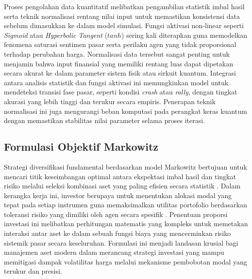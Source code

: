 Proses pengolahan data kuantitatif melibatkan pengambilan statistik imbal hasil serta teknik normalisasi rentang nilai input untuk memastikan konsistensi data sebelum dimasukkan ke dalam model simulasi. Fungsi aktivasi non-linear seperti \textit{Sigmoid} atau \textit{Hyperbolic Tangent} ($tanh$) sering kali diterapkan guna memodelkan fenomena saturasi sentimen pasar serta perilaku agen yang tidak proporsional terhadap perubahan harga. Normalisasi data tersebut sangat penting untuk menjamin bahwa input finansial yang memiliki rentang luas dapat dipetakan secara akurat ke dalam parameter sistem fisik atau sirkuit kuantum. Integrasi antara analisis statistik dan fungsi aktivasi ini memungkinkan model untuk mendeteksi transisi fase pasar, seperti kondisi \textit{crash} atau \textit{rally}, dengan tingkat akurasi yang lebih tinggi dan terukur secara empiris. Penerapan teknik normalisasi ini juga mengurangi beban komputasi pada perangkat keras kuantum dengan memastikan stabilitas nilai parameter selama proses iterasi.

\subsection{Formulasi Objektif Markowitz}
Strategi diversifikasi fundamental berdasarkan model Markowitz bertujuan untuk mencari titik keseimbangan optimal antara ekspektasi imbal hasil dan tingkat risiko melalui seleksi kombinasi aset yang paling efisien secara statistik \cite{markowitz_portfolio_1952}. Dalam kerangka kerja ini, investor berupaya untuk menentukan alokasi modal yang tepat pada setiap instrumen guna memaksimalkan utilitas portofolio berdasarkan toleransi risiko yang dimiliki oleh agen secara spesifik \cite{abdul_hali_markowitz_2020}. Penentuan proporsi investasi ini melibatkan perhitungan matematis yang kompleks untuk memetakan interaksi antar aset ke dalam sebuah fungsi biaya yang mencerminkan risiko sistemik pasar secara keseluruhan. Formulasi ini menjadi landasan krusial bagi manajemen aset modern dalam merancang strategi investasi yang mampu memitigasi dampak volatilitas harga melalui mekanisme pembobotan modal yang terukur dan presisi.

